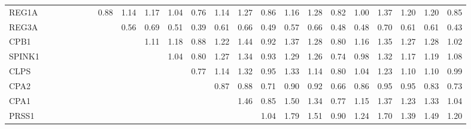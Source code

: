 \begin{longtable}{lrrrrrrrrrrrrrrrrrrrrrr}
REG1A    &              &              &              &              &             &             &        0.88 &       1.14 &         1.17 &       1.04 &       0.76 &       1.14 &        1.27 &      0.86 &        1.16 &           1.28 &      0.82 &          1.00 &      1.37 &        1.20 &        1.20 &       0.85 \\
REG3A    &              &              &              &              &             &             &             &       0.56 &         0.69 &       0.51 &       0.39 &       0.61 &        0.66 &      0.49 &        0.57 &           0.66 &      0.48 &          0.48 &      0.70 &        0.61 &        0.61 &       0.43 \\
CPB1     &              &              &              &              &             &             &             &            &         1.11 &       1.18 &       0.88 &       1.22 &        1.44 &      0.92 &        1.37 &           1.28 &      0.80 &          1.16 &      1.35 &        1.27 &        1.28 &       1.02 \\
SPINK1   &              &              &              &              &             &             &             &            &              &       1.04 &       0.80 &       1.27 &        1.34 &      0.93 &        1.29 &           1.26 &      0.74 &          0.98 &      1.32 &        1.17 &        1.19 &       1.08 \\
CLPS     &              &              &              &              &             &             &             &            &              &            &       0.77 &       1.14 &        1.32 &      0.95 &        1.33 &           1.14 &      0.80 &          1.04 &      1.23 &        1.10 &        1.10 &       0.99 \\
CPA2     &              &              &              &              &             &             &             &            &              &            &            &       0.87 &        0.88 &      0.71 &        0.90 &           0.92 &      0.66 &          0.86 &      0.95 &        0.95 &        0.83 &       0.73 \\
CPA1     &              &              &              &              &             &             &             &            &              &            &            &            &        1.46 &      0.85 &        1.50 &           1.34 &      0.77 &          1.15 &      1.37 &        1.23 &        1.33 &       1.04 \\
PRSS1    &              &              &              &              &             &             &             &            &              &            &            &            &             &      1.04 &        1.79 &           1.51 &      0.90 &          1.24 &      1.70 &        1.39 &        1.49 &       1.20 \\

\end{longtable}
